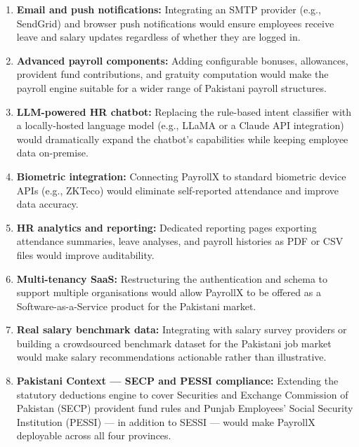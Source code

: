 \documentclass[12pt,a4paper]{report}
\begin{document}
\begin{enumerate}
    \item \textbf{Email and push notifications:} Integrating an SMTP provider (e.g., SendGrid) and browser push notifications would ensure employees receive leave and salary updates regardless of whether they are logged in.

    \item \textbf{Advanced payroll components:} Adding configurable bonuses, allowances, provident fund contributions, and gratuity computation would make the payroll engine suitable for a wider range of Pakistani payroll structures.

    \item \textbf{LLM-powered HR chatbot:} Replacing the rule-based intent classifier with a locally-hosted language model (e.g., LLaMA or a Claude API integration) would dramatically expand the chatbot's capabilities while keeping employee data on-premise.

    \item \textbf{Biometric integration:} Connecting PayrollX to standard biometric device APIs (e.g., ZKTeco) would eliminate self-reported attendance and improve data accuracy.

    \item \textbf{HR analytics and reporting:} Dedicated reporting pages exporting attendance summaries, leave analyses, and payroll histories as PDF or CSV files would improve auditability.

    \item \textbf{Multi-tenancy SaaS:} Restructuring the authentication and schema to support multiple organisations would allow PayrollX to be offered as a Software-as-a-Service product for the Pakistani market.

    \item \textbf{Real salary benchmark data:} Integrating with salary survey providers or building a crowdsourced benchmark dataset for the Pakistani job market would make salary recommendations actionable rather than illustrative.

    \item \textbf{Pakistani Context --- SECP and PESSI compliance:} Extending the statutory deductions engine to cover Securities and Exchange Commission of Pakistan (SECP) provident fund rules and Punjab Employees' Social Security Institution (PESSI) --- in addition to SESSI --- would make PayrollX deployable across all four provinces.
\end{enumerate}
\end{document}
